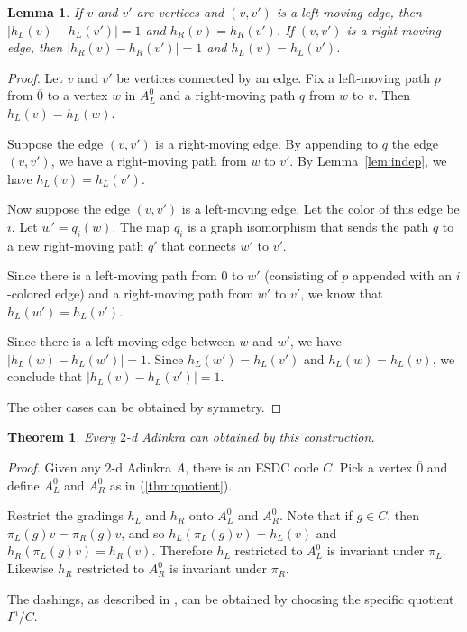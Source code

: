 \documentclass[12pt,twoside,singlespace]{article}
\numberwithin{equation}{section}
\newtheorem{thm}[equation]{Theorem}
\newtheorem{lem}[equation]{Lemma}
\theoremstyle{definition}
\begin{document}
\begin{lem}
If $v$ and $v'$ are vertices and $(v,v')$ is a left-moving edge, then
$|h_L(v)-h_L(v')|=1$ and $h_R(v)=h_R(v')$.  If $(v,v')$ is a right-moving edge, then $|h_R(v)-h_R(v')|=1$ and $h_L(v)=h_L(v')$.
\end{lem}

\begin{proof}
Let $v$ and $v'$ be vertices connected by an edge.  Fix a left-moving path $p$ from $\overline{0}$ to a vertex $w$ in $A_L^0$ and a right-moving path $q$ from $w$ to $v$.  Then $h_L(v)=h_L(w)$.

Suppose the edge $(v,v')$ is a right-moving edge.  By appending to $q$ the edge $(v,v')$, we have a right-moving path from $w$ to $v'$.  By Lemma~\ref{lem:indep}, we have $h_L(v)=h_L(v')$.

Now suppose the edge $(v,v')$ is a left-moving edge.  Let the color of this edge be $i$.  Let $w'=q_i(w)$.  The map $q_i$ is a graph isomorphism that sends the path $q$ to a new right-moving path $q'$ that connects $w'$ to $v'$.

Since there is a left-moving path from $\overline{0}$ to $w'$ (consisting of $p$ appended with an $i$-colored edge) and a right-moving path from $w'$ to $v'$, we know that $h_L(w')=h_L(v')$.  

Since there is a left-moving edge between $w$ and $w'$, we have $|h_L(w)-h_L(w')|=1$.  Since $h_L(w')=h_L(v')$ and $h_L(w)=h_L(v)$, we conclude that $|h_L(v)-h_L(v')|=1$.

The other cases can be obtained by symmetry.
\end{proof}


\begin{thm}
Every $2$-d Adinkra can obtained by this construction.
\end{thm}

\begin{proof}
Given any $2$-d Adinkra $A$, there is an ESDC code $C$.  Pick a vertex $\overline{0}$ and define $A_L^0$ and $A_R^0$ as in (\ref{thm:quotient}).

Restrict the gradings $h_L$ and $h_R$ onto $A_L^0$ and $A_R^0$.  Note that if $g\in C$, then $\pi_L(g)v=\pi_R(g)v$, and so $h_L(\pi_L(g)v)=h_L(v)$ and $h_R(\pi_L(g)v)=h_R(v)$.  Therefore $h_L$ restricted to $A_L^0$ is invariant under $\pi_L$.  Likewise $h_R$ restricted to $A_R^0$ is invariant under $\pi_R$.

The dashings, as described in \cite{rAT2}, can be obtained by choosing the specific quotient $I^n/C$.

Theorem~\ref{thm:quotient} gives a description of $A$ in terms of this construction.

\end{proof}
\end{document}
